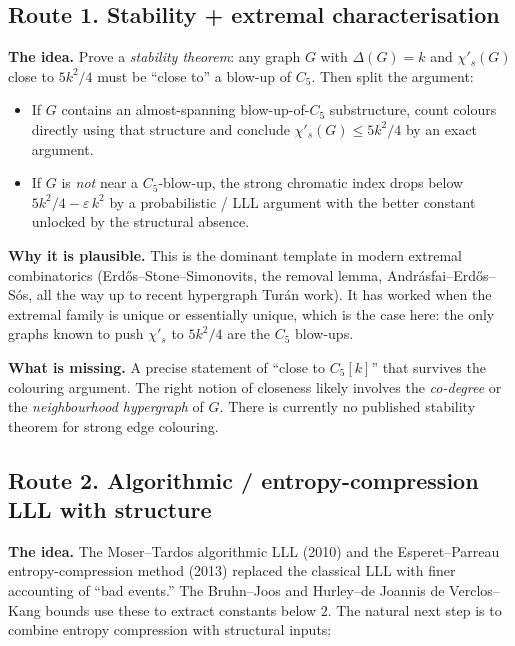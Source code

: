 \documentclass[11pt]{article}
\newcommand{\sci}{\chi'_s}
\begin{document}
\subsection*{Route 1. Stability + extremal characterisation}

\textbf{The idea.} Prove a \emph{stability theorem}: any graph $G$
with $\Delta(G) = k$ and $\sci(G)$ close to $5k^2/4$ must be
``close to'' a blow-up of $C_5$. Then split the argument:

\begin{itemize}[leftmargin=*, itemsep=2pt]
  \item If $G$ contains an almost-spanning blow-up-of-$C_5$
        substructure, count colours directly using that structure
        and conclude $\sci(G) \leq 5k^2/4$ by an exact argument.
  \item If $G$ is \emph{not} near a $C_5$-blow-up, the strong
        chromatic index drops below $5k^2/4 - \varepsilon\,k^2$ by
        a probabilistic / LLL argument with the better constant
        unlocked by the structural absence.
\end{itemize}

\textbf{Why it is plausible.} This is the dominant template in
modern extremal combinatorics (Erd\H{o}s--Stone--Simonovits, the
removal lemma, Andr\'asfai--Erd\H{o}s--S\'os, all the way up to recent
hypergraph Tur\'an work). It has worked when the extremal family is
unique or essentially unique, which is the case here: the only
graphs known to push $\sci$ to $5k^2/4$ are the $C_5$ blow-ups.

\textbf{What is missing.} A precise statement of ``close to $C_5[k]$''
that survives the colouring argument. The right notion of closeness
likely involves the \emph{co-degree} or the \emph{neighbourhood
hypergraph} of $G$. There is currently no published stability theorem
for strong edge colouring.

\subsection*{Route 2. Algorithmic / entropy-compression LLL with structure}

\textbf{The idea.} The Moser--Tardos algorithmic LLL (2010) and the
Esperet--Parreau entropy-compression method (2013) replaced the
classical LLL with finer accounting of ``bad events.'' The Bruhn--Joos
and Hurley--de Joannis de Verclos--Kang bounds use these to extract
constants below $2$. The natural next step is to combine entropy
compression with structural inputs:
\end{document}
